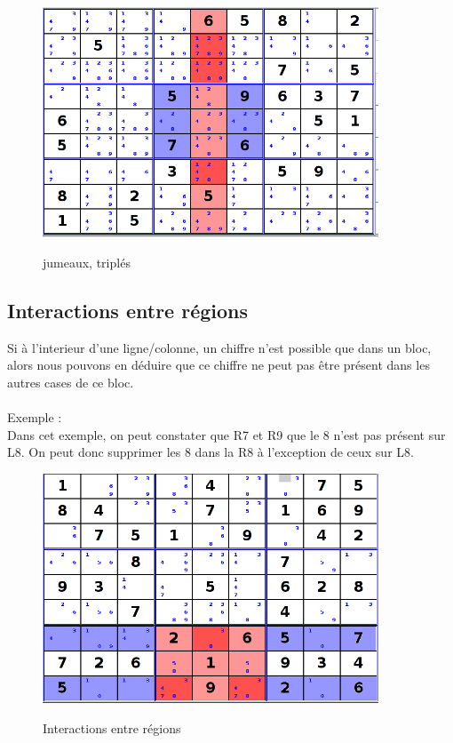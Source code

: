 \begin{figure}[ht]
  \caption{\label{annexe3} jumeaux, triplés}
  \includegraphics [width=100mm]{images/PairTriplet.png} \\[0.5cm]
\end{figure}

\newpage

\subsection{Interactions entre régions}
Si à l’interieur d’une ligne/colonne, un chiffre n’est possible que dans un bloc, alors
nous pouvons en déduire que ce chiffre ne peut pas être présent dans les autres cases de
ce bloc.\\
\\

Exemple :\\
Dans cet exemple, on peut constater que R7 et R9 que le 8 n'est pas présent sur L8. 
On peut donc supprimer les 8 dans la R8 à l'exception de ceux sur L8.

\begin{figure}[ht]
  \caption{\label{annexe4} Interactions entre régions}
  \includegraphics [width=100mm]{images/InteractionBetweenSector.png} \\[0.5cm]
\end{figure}

